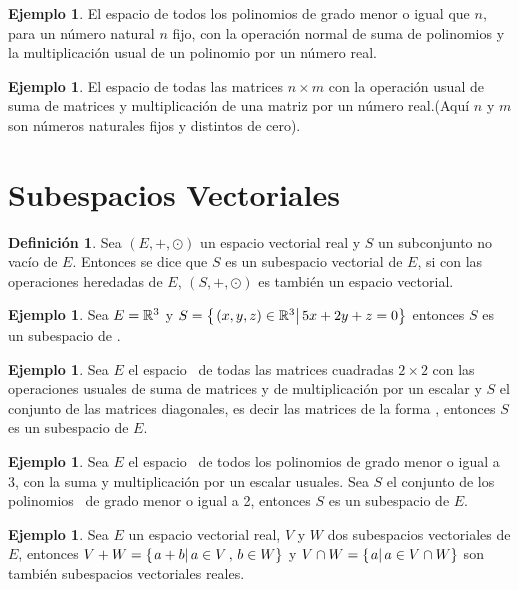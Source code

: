 \documentclass[10pt,a4paper]{amsbook}
\theoremstyle{definition}
\newtheorem{dfn}[theorem]{Definición}
\newtheorem{ejemplo}[theorem]{Ejemplo}
\theoremstyle{remark}
\numberwithin{section}{chapter}
\numberwithin{equation}{chapter}
\begin{document}
\begin{ejemplo}
El espacio de todos los polinomios de grado menor o igual que $n$, para un número natural $n$ fijo, con la operación normal de suma de polinomios y la multiplicación usual de un polinomio por un número real.
\end{ejemplo}

\begin{ejemplo}
El espacio de todas las matrices $n \times m$ con la operación usual de suma de matrices y multiplicación de una matriz por un número real.(Aquí $n$ y $m$ son números naturales fijos y distintos de cero).


\end{ejemplo}

\section{Subespacios Vectoriales}
\begin{dfn}
Sea $(E, +, \odot)$ un espacio vectorial real y $S$ un subconjunto no vacío de $E$. Entonces se dice que $S$ es un subespacio vectorial de $E$, si con las operaciones heredadas de $E$, $(S, +, \odot)$ es también un espacio vectorial.

\end{dfn}

\begin{ejemplo}
Sea $E = \mathbb{R}^3$ y $S = \left\{ \left. (x, y, z) \in \mathbb{R}^3\right| 5x + 2y + z = 0 \right\}$ entonces $S$ es un subespacio de \rtres.
\end{ejemplo}

\begin{ejemplo}
Sea $E$ el espacio \mdosxdos \ de todas las matrices cuadradas $2 \times 2$ con las operaciones usuales de suma de matrices y de multiplicación por un escalar y $S$ el conjunto de las matrices diagonales, es decir las matrices de la forma , entonces $S$ es un subespacio de $E$.

\end{ejemplo}

\begin{ejemplo}
Sea $E$ el espacio \ptres \ de todos los polinomios de grado menor o igual a 3, con la suma y multiplicación por un escalar usuales. Sea $S$ el conjunto de los polinomios \pdos \ de grado menor o igual a 2, entonces $S$ es un subespacio de $E$.
\end{ejemplo}

\begin{ejemplo}

Sea $E$ un espacio vectorial real, $V$ y $W$ dos subespacios vectoriales de $E$, entonces $V + W =\left\{ \left. a+b\right| a \in V \, , \, b \in W \right\}$ y $V \cap W = \left\{ \left. a\right| a \in V \cap W \right\}$ son también subespacios vectoriales reales.
\end{ejemplo}
\end{document}
